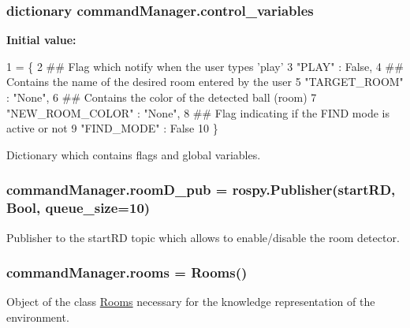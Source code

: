 \subsubsection[{\texorpdfstring{control\+\_\+variables}{control_variables}}]{\setlength{\rightskip}{0pt plus 5cm}dictionary command\+Manager.\+control\+\_\+variables}\hypertarget{namespacecommandManager_a3c82d03952562f9cf96be2e80ae059a3}{}\label{namespacecommandManager_a3c82d03952562f9cf96be2e80ae059a3}
{\bfseries Initial value\+:}
\begin{DoxyCode}
1 = \{
2     \textcolor{comment}{## Flag which notify when the user types 'play'}
3     \textcolor{stringliteral}{"PLAY"} : \textcolor{keyword}{False},
4     \textcolor{comment}{## Contains the name of the desired room entered by the user }
5     \textcolor{stringliteral}{"TARGET\_ROOM"} : \textcolor{stringliteral}{"None"},
6     \textcolor{comment}{## Contains the color of the detected ball (room) }
7     \textcolor{stringliteral}{"NEW\_ROOM\_COLOR"} : \textcolor{stringliteral}{"None"},
8     \textcolor{comment}{## Flag indicating if the FIND mode is active or not }
9     \textcolor{stringliteral}{"FIND\_MODE"} : \textcolor{keyword}{False}   
10 \}
\end{DoxyCode}


Dictionary which contains flags and global variables. 

\subsubsection[{\texorpdfstring{room\+D\+\_\+pub}{roomD_pub}}]{\setlength{\rightskip}{0pt plus 5cm}command\+Manager.\+room\+D\+\_\+pub = rospy.\+Publisher(\textquotesingle{}start\+RD\textquotesingle{}, Bool, queue\+\_\+size=10)}\hypertarget{namespacecommandManager_a5cf709943d61e92e0ce4c1652403ae8d}{}\label{namespacecommandManager_a5cf709943d61e92e0ce4c1652403ae8d}


Publisher to the start\+RD topic which allows to enable/disable the room detector. 

\subsubsection[{\texorpdfstring{rooms}{rooms}}]{\setlength{\rightskip}{0pt plus 5cm}command\+Manager.\+rooms = {\bf Rooms}()}\hypertarget{namespacecommandManager_a868809e1f6a79e7b7ce5ea405e978d48}{}\label{namespacecommandManager_a868809e1f6a79e7b7ce5ea405e978d48}


Object of the class \hyperlink{namespaceRooms}{Rooms} necessary for the knowledge representation of the environment. 

